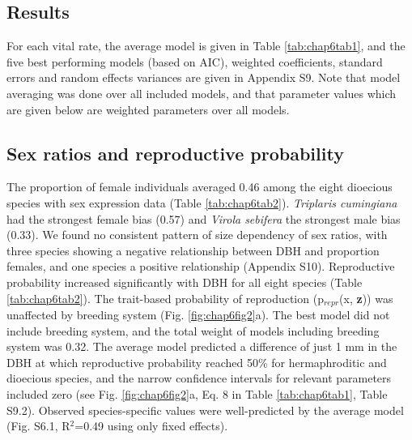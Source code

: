 \documentclass[b5paper,justified]{tufte-book} %
\begin{document}
\begin{fullwidth}
\section{Results}
For each vital rate, the average model is given in Table \ref{tab:chap6tab1}, and the five best performing models (based on AIC), weighted coefficients, standard errors and random effects variances are given in Appendix S9. Note that model averaging was done over all included models, and that parameter values which are given below are weighted parameters over all models.

\subsection{Sex ratios and reproductive probability}
The proportion of female individuals averaged 0.46 among the eight dioecious species with sex expression data (Table \ref{tab:chap6tab2}). \textit{Triplaris cumingiana} had the strongest female bias (0.57) and \textit{Virola sebifera} the strongest male bias (0.33). We found no consistent pattern of size dependency of sex ratios, with three species showing a negative relationship between DBH and proportion females, and one species a positive relationship (Appendix S10). Reproductive probability increased significantly with DBH for all eight species (Table \ref{tab:chap6tab2}).
The trait-based probability of reproduction (p$_{repr}$(x, \textbf{z})) was unaffected by breeding system (Fig. \ref{fig:chap6fig2}a). The best model did not include breeding system, and the total weight of models including breeding system was 0.32. The average model predicted a difference of just 1 mm in the DBH at which reproductive probability reached 50\% for hermaphroditic and dioecious species, and the narrow confidence intervals for relevant parameters included zero (see Fig. \ref{fig:chap6fig2}a, Eq. 8 in Table \ref{tab:chap6tab1}, Table S9.2). Observed species-specific values were well-predicted by the average model (Fig. S6.1, R$^2$=0.49 using only fixed effects).


\end{fullwidth}
\end{document}
